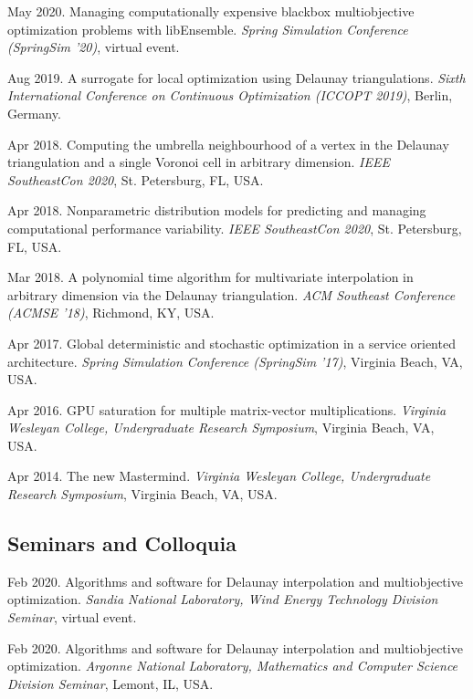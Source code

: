 \documentclass[10pt]{article}
\begin{document}
May 2020. Managing computationally expensive blackbox multiobjective optimization problems with libEnsemble. {\sl Spring Simulation Conference (SpringSim '20)}, virtual event. 

\medskip

Aug 2019. A surrogate for local optimization using Delaunay triangulations. {\sl Sixth International Conference on Continuous Optimization (ICCOPT 2019)}, Berlin, Germany. 

\medskip

Apr 2018. Computing the umbrella neighbourhood of a vertex in the Delaunay triangulation and a single Voronoi cell in arbitrary dimension. {\sl IEEE SoutheastCon 2020}, St. Petersburg, FL, USA. 

\medskip

Apr 2018. Nonparametric distribution models for predicting and managing computational performance variability. {\sl IEEE SoutheastCon 2020}, St. Petersburg, FL, USA. 

\medskip

Mar 2018. A polynomial time algorithm for multivariate interpolation in arbitrary dimension via the Delaunay triangulation. {\sl ACM Southeast Conference (ACMSE '18)}, Richmond, KY, USA. 

\medskip

Apr 2017. Global deterministic and stochastic optimization in a service oriented architecture. {\sl Spring Simulation Conference (SpringSim '17)}, Virginia Beach, VA, USA. 

\medskip

Apr 2016. GPU saturation for multiple matrix-vector multiplications. {\sl Virginia Wesleyan College, Undergraduate Research Symposium}, Virginia Beach, VA, USA. 

\medskip

Apr 2014. The new Mastermind. {\sl Virginia Wesleyan College, Undergraduate Research Symposium}, Virginia Beach, VA, USA. 
\subsection*{Seminars and Colloquia}
Feb 2020. Algorithms and software for Delaunay interpolation and multiobjective optimization. {\sl Sandia National Laboratory, Wind Energy Technology Division Seminar}, virtual event. 

\medskip

Feb 2020. Algorithms and software for Delaunay interpolation and multiobjective optimization. {\sl Argonne National Laboratory, Mathematics and Computer Science Division Seminar}, Lemont, IL, USA. 
\end{document}
